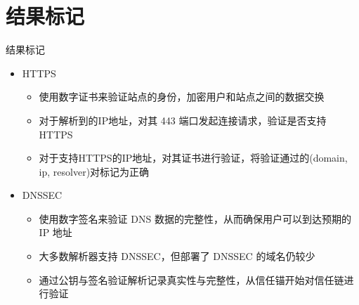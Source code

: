 \documentclass{beamer}
\begin{document}
\section{结果标记}
  \begin{frame}{结果标记}
    \begin{itemize}
      \item HTTPS
      \begin{itemize}
        \item 使用数字证书来验证站点的身份，加密用户和站点之间的数据交换
        \item 对于解析到的IP地址，对其 443 端口发起连接请求，验证是否支持HTTPS
        \item 对于支持HTTPS的IP地址，对其证书进行验证，将验证通过的(domain, ip, resolver)对标记为正确
      \end{itemize}
      \item DNSSEC
      \begin{itemize}
        \item 使用数字签名来验证 DNS 数据的完整性，从而确保用户可以到达预期的 IP 地址
        \item 大多数解析器支持 DNSSEC，但部署了 DNSSEC 的域名仍较少
        \item 通过公钥与签名验证解析记录真实性与完整性，从信任锚开始对信任链进行验证
      \end{itemize}
    \end{itemize}

  \end{frame}
\end{document}
